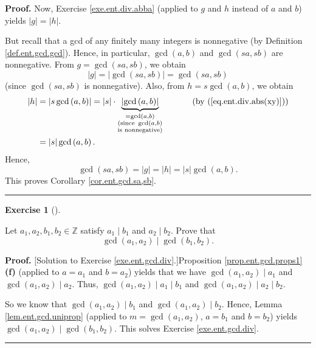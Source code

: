\documentclass[numbers=enddot,12pt,final,onecolumn,notitlepage]{scrartcl}%
\newcounter{exer}
\numberwithin{exer}{subsection}
\theoremstyle{definition}
\newtheorem{exmp}[exer]{Exercise}
\newenvironment{exercise}[1][]
{\begin{exmp}[#1]\begin{leftbar}}
{\end{leftbar}\end{exmp}}
\newenvironment{fineprint}{\begin{small}}{\end{small}}
\newenvironment{proof}[1][Proof]{\noindent\textbf{#1.} }{\ \rule{0.5em}{0.5em}}
\begin{document}
\begin{proof}
Now, Exercise \ref{exe.ent.div.abba} (applied to $g$ and $h$ instead of $a$
and $b$) yields $\left\vert g\right\vert =\left\vert h\right\vert $.

But recall that a gcd of any finitely many integers is nonnegative (by
Definition \ref{def.ent.gcd.gcd}). Hence, in particular, $\gcd\left(
a,b\right)  $ and $\gcd\left(  sa,sb\right)  $ are nonnegative. From
$g=\gcd\left(  sa,sb\right)  $, we obtain%
\[
\left\vert g\right\vert =\left\vert \gcd\left(  sa,sb\right)  \right\vert
=\gcd\left(  sa,sb\right)
\]
(since $\gcd\left(  sa,sb\right)  $ is nonnegative). Also, from $h=s\gcd
\left(  a,b\right)  $, we obtain%
\begin{align*}
\left\vert h\right\vert  &  =\left\vert s\gcd\left(  a,b\right)  \right\vert
=\left\vert s\right\vert \cdot\underbrace{\left\vert \gcd\left(  a,b\right)
\right\vert }_{\substack{=\gcd\left(  a,b\right)  \\\text{(since }\gcd\left(
a,b\right)  \\\text{is nonnegative)}}}\ \ \ \ \ \ \ \ \ \ \left(  \text{by
(\ref{eq.ent.div.abs(xy)})}\right) \\
&  =\left\vert s\right\vert \gcd\left(  a,b\right)  .
\end{align*}
Hence,
\[
\gcd\left(  sa,sb\right)  =\left\vert g\right\vert =\left\vert h\right\vert
=\left\vert s\right\vert \gcd\left(  a,b\right)  .
\]
This proves Corollary \ref{cor.ent.gcd.sa,sb}.
\end{proof}

\begin{exercise}
\label{exe.ent.gcd.div}Let $a_{1},a_{2},b_{1},b_{2}\in\mathbb{Z}$ satisfy
$a_{1}\mid b_{1}$ and $a_{2}\mid b_{2}$. Prove that%
\[
\gcd\left(  a_{1},a_{2}\right)  \mid\gcd\left(  b_{1},b_{2}\right)  .
\]

\end{exercise}

\begin{fineprint}
\begin{proof}
[Solution to Exercise \ref{exe.ent.gcd.div}.]Proposition
\ref{prop.ent.gcd.props1} \textbf{(f)} (applied to $a=a_{1}$ and $b=a_{2}$)
yields that we have $\gcd\left(  a_{1},a_{2}\right)  \mid a_{1}$ and
$\gcd\left(  a_{1},a_{2}\right)  \mid a_{2}$. Thus, $\gcd\left(  a_{1}%
,a_{2}\right)  \mid a_{1}\mid b_{1}$ and $\gcd\left(  a_{1},a_{2}\right)  \mid
a_{2}\mid b_{2}$.

So we know that $\gcd\left(  a_{1},a_{2}\right)  \mid b_{1}$ and $\gcd\left(
a_{1},a_{2}\right)  \mid b_{2}$. Hence, Lemma \ref{lem.ent.gcd.uniprop}
(applied to $m=\gcd\left(  a_{1},a_{2}\right)  $, $a=b_{1}$ and $b=b_{2}$)
yields $\gcd\left(  a_{1},a_{2}\right)  \mid\gcd\left(  b_{1},b_{2}\right)  $.
This solves Exercise \ref{exe.ent.gcd.div}.
\end{proof}
\end{fineprint}
\end{document}
